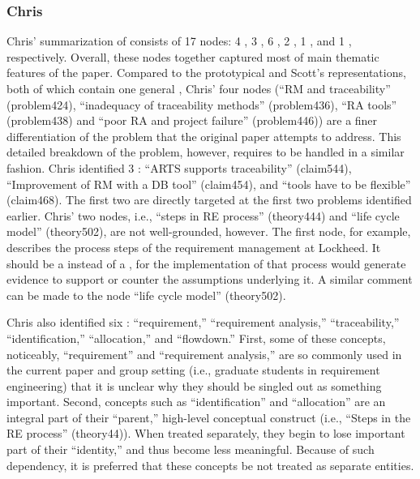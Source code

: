 \subsubsection{Chris}

Chris' summarization of \cite{Flynn90} consists of 17 nodes: 4 , 3 , 6 , 2 , 1 , and 1 , respectively.
Overall, these nodes together captured most of main thematic features of
the paper. Compared to the prototypical and Scott's representations, both
of which contain one general , Chris' four  nodes (``RM and traceability'' (problem424), ``inadequacy of
traceability methods'' (problem436), ``RA tools'' (problem438) and ``poor
RA and project failure'' (problem446)) are a finer differentiation of the
problem that the original paper attempts to address. This detailed
breakdown of the problem, however, requires  to be
handled in a similar fashion. Chris identified 3 : ``ARTS
supports traceability'' (claim544), ``Improvement of RM with a DB tool''
(claim454), and ``tools have to be flexible'' (claim468). The first two are
directly targeted at the first two problems identified earlier.  Chris' two
 nodes, i.e., ``steps in RE process'' (theory444) and
``life cycle model'' (theory502), are not well-grounded, however. The first
node, for example, describes the process steps of the requirement
management at Lockheed. It should be a  instead of a
, for the implementation of that process would generate
evidence to support or counter the assumptions underlying it. A similar
comment can be made to the node ``life cycle model'' (theory502).

Chris also identified six : ``requirement,''
``requirement analysis,'' ``traceability,'' ``identification,''
``allocation,'' and ``flowdown.'' First, some of these concepts,
noticeably, ``requirement'' and ``requirement analysis,'' are so commonly
used in the current paper and group setting (i.e., graduate students in
requirement engineering) that it is unclear why they should be singled out
as something important. Second, concepts such as ``identification'' and
``allocation'' are an integral part of their ``parent,'' high-level
conceptual construct (i.e., ``Steps in the RE process'' (theory44)). When
treated separately, they begin to lose important part of their
``identity,'' and thus become less meaningful. Because of such dependency,
it is preferred that these concepts be not treated as separate entities.

